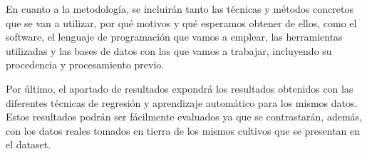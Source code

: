 \par En cuanto a la metodología, se incluirán tanto las técnicas y métodos concretos que se van a utilizar, por qué motivos y qué esperamos obtener de ellos, como el software, el lenguaje de programación que vamos a emplear, las herramientas utilizadas y las bases de datos con las que vamos a trabajar, incluyendo su procedencia y procesamiento previo. 
\\
\par Por último, el apartado de resultados expondrá los resultados obtenidos con las diferentes técnicas de regresión y aprendizaje automático para los mismos datos. Estos resultados podrán ser fácilmente evaluados ya que se contrastarán, además, con los datos reales tomados en tierra de los mismos cultivos que se presentan en el dataset. 
